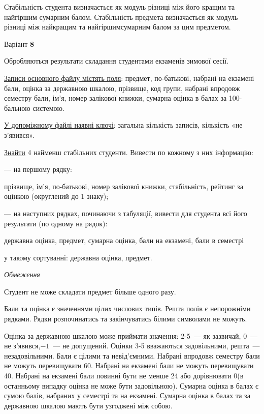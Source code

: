 \documentclass[11pt, ukrainian]{article}
\begin{document}
Стабільність студента визначається як модуль різниці між його кращим та найгіршим сумарним балом.
Стабільність предмета визначається як модуль різниці між найкращим та найгіршимсумарним балом за цим предметом.




\par
\newpage
{\center Варіант  \No \textbf { 8 }\par}
\bigskip
Обробляються результати складання студентами екзаменів зимової сесії.

\underline{Записи основного файлу містять поля}: предмет, по-батькові, набрані на екзамені бали, оцінка за державною шкалою, прізвище, код групи, набрані впродовж семестру бали, ім’я, номер залікової книжки, сумарна оцінка в балах за 100-бальною системою.

\underline{У допоміжному файлі наявні ключі}: загальна кількість записів, кількість «не з’явився».

\underline{Знайти} 4 найменш стабільних студенти. Вивести по кожному з них інформацію:\par
{\noindent}--- на першому рядку:\par
прізвище, ім’я, по-батькові, номер залікової книжки, стабільність, рейтинг за оцінкою (округлений до 1 знаку);

{\noindent}--- на наступних рядках, починаючи з табуляції, вивести для студента всі його результати (по одному на рядок):\par
державна оцінка, предмет, сумарна оцінка, бали на екзамені, бали в семестрі

{\noindent}у такому сортуванні: державна оцінка, предмет.


\bigskip\textit{Обмеження}

Студент не може складати предмет більше одного разу.

Бали та оцінка є значеннями цілих числових типів. Решта полів є непорожніми рядками.
Рядки розпочинатись та закінчуватись білими символами не можуть.

Оцінка за державною шкалою може приймати значення: 2-5~--- як зазвичай, 0~--- не з’явився,$-1$~--- не допущений. 
Оцінки 3-5 вважаються задовільними, решта~--- незадовільними. 
Бали є цілими та невід’ємними.
Набрані впродовж семестру бали не можуть перевищувати 60. 
Набрані на екзамені бали не можуть перевищувати 40. 
Набрані на екзамені бали повинні бути не менше 24 або дорівнювати 0(в останньому випадку оцінка не може бути задовільною). 
Сумарна оцінка в балах є сумою балів, набраних у семестрі та на екзамені.
Сумарна оцінка в балах та за державною шкалою мають бути узгоджені між собою.
\end{document}
